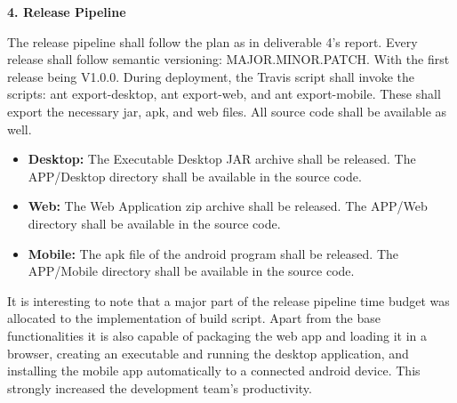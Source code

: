 \documentclass[12pt]{article}
\begin{document}
\textbf{4. Release Pipeline}


The release pipeline shall follow the plan as in deliverable 4's report. Every release shall follow semantic versioning: MAJOR.MINOR.PATCH. With the first release being V1.0.0. During deployment, the Travis script shall invoke the scripts: ant export-desktop, ant export-web, and ant export-mobile. These shall export the necessary jar, apk, and web files. All source code shall be available as well.
\begin{itemize}
	\item \textbf{Desktop:} The Executable Desktop JAR archive shall be released. The APP/Desktop directory shall be available in the source code.
	\item \textbf{Web:} The Web Application zip archive shall be released. The APP/Web directory shall be available in the source code.
	\item \textbf{Mobile:} The apk file of the android program shall be released. The APP/Mobile directory shall be available in the source code.
\end{itemize}

It is interesting to note that a major part of the release pipeline time budget was allocated to the
implementation of build script. Apart from the base functionalities it is also capable of packaging
the web app and loading it in a browser, creating an executable and running the desktop application,
and installing the mobile app automatically to a connected android device. This strongly increased
the development team's productivity.\\
\end{document}
